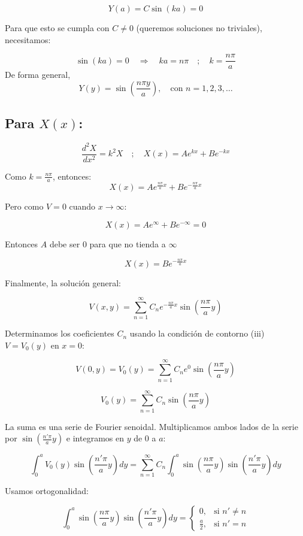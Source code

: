 \documentclass[12pt]{article}
\begin{document}
\[
Y(a) = C \sin(ka) = 0
\]

Para que esto se cumpla con \( C \ne 0 \) (queremos soluciones no triviales), necesitamos:

\[
\sin(ka) = 0 \quad \Rightarrow \quad ka = n\pi \quad ; \quad k = \frac{n\pi}{a}
\]
De forma general,
\[
\boxed{Y(y) = \sin\left(\frac{n\pi y}{a}\right), \quad \text{con } n = 1, 2, 3, \ldots}
\]

\subsection*{Para \( X(x) \):}

\[
\frac{d^2 X}{dx^2} = k^2 X \quad ; \quad X(x) = A e^{kx} + B e^{-kx}
\]

Como \( k = \frac{n\pi}{a} \), entonces:
\[
X(x) = A e^{\frac{n\pi}{a}x} + B e^{-\frac{n\pi}{a}x}
\]

Pero como \( V = 0 \) cuando \( x \to \infty \):

\[
X(x) = A e^{\infty} + B e^{-\infty} = 0
\]

Entonces \(A \) debe ser \( 0\) para que no tienda a \(\infty\)

\[
\boxed{X(x) = B e^{-\frac{n\pi}{a}x}}
\]


Finalmente, la solución general:

\[
\boxed{V(x,y) = \sum_{n=1}^{\infty} C_n e^{-\frac{n \pi}{a} x} \sin\left( \frac{n \pi}{a} y \right)} \tag{1}
\]

Determinamos los coeficientes \( C_n \) usando la condición de contorno (iii) \( V = V_0(y) \) en \( x=0 \):

\[
V(0,y) = V_0(y) = \sum_{n=1}^{\infty} C_n e^{0} \sin\left( \frac{n \pi}{a} y \right)
\]

\[
V_0(y) = \sum_{n=1}^{\infty} C_n \sin\left( \frac{n \pi}{a} y \right) \tag{*}
\]

La suma es una serie de Fourier senoidal. Multiplicamos ambos lados de la serie por \( \sin\left( \frac{n' \pi}{a} y \right) \) e integramos en \( y \) de 0 a \( a \):

\[
\int_0^a V_0(y) \sin\left( \frac{n' \pi}{a} y \right) dy = \sum_{n=1}^{\infty} C_n \int_0^a \sin\left( \frac{n \pi}{a} y \right) \sin\left( \frac{n' \pi}{a} y \right) dy
\]

Usamos ortogonalidad:

\[
\int_0^a \sin\left( \frac{n \pi}{a} y \right) \sin\left( \frac{n' \pi}{a} y \right) dy = 
\begin{cases}
0, & \text{si } n' \neq n \\
\frac{a}{2}, & \text{si } n' = n
\end{cases}
\]
\end{document}
